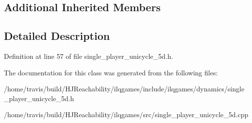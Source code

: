 \subsection*{Additional Inherited Members}


\subsection{Detailed Description}


Definition at line 57 of file single\+\_\+player\+\_\+unicycle\+\_\+5d.\+h.



The documentation for this class was generated from the following files\+:\begin{DoxyCompactItemize}
\item 
/home/travis/build/\+H\+J\+Reachability/ilqgames/include/ilqgames/dynamics/single\+\_\+player\+\_\+unicycle\+\_\+5d.\+h\item 
/home/travis/build/\+H\+J\+Reachability/ilqgames/src/single\+\_\+player\+\_\+unicycle\+\_\+5d.\+cpp\end{DoxyCompactItemize}
